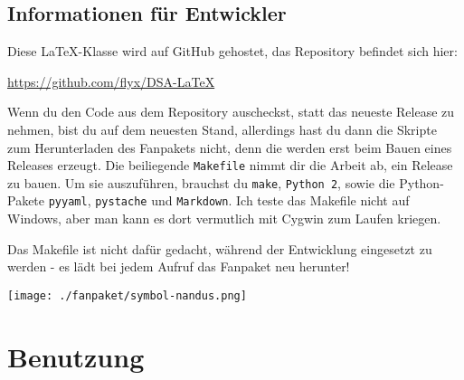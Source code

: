 \documentclass{dsa}
\begin{document}
  \begin{dsaBoxPortrait}
    \subsection*{\normalsize Informationen für Entwickler}
    
    Diese LaTeX-Klasse wird auf GitHub gehostet, das Repository befindet sich
    hier:
    
    \url{https://github.com/flyx/DSA-LaTeX}
    
    Wenn du den Code aus dem Repository aus\-checkst, statt das neueste
    Release zu nehmen, bist du auf dem neuesten Stand, allerdings hast du
    dann die Skripte zum Herunterladen des Fanpakets nicht, denn die werden
    erst beim Bauen eines Releases erzeugt. Die beiliegende \texttt{Makefile}
    nimmt dir die Arbeit ab, ein Release zu bauen. Um sie auszuführen, brauchst
    du \texttt{make}, \texttt{Python 2}, sowie die Python-Pakete
    \texttt{pyyaml}, \texttt{pystache} und \texttt{Markdown}. Ich teste das
    Makefile nicht auf Windows, aber man kann es dort vermutlich mit
    Cygwin zum Laufen kriegen. 
    
    Das Makefile ist nicht dafür gedacht, während der Entwicklung eingesetzt
    zu werden - es lädt bei jedem Aufruf das Fanpaket neu herunter!
    
  \end{dsaBoxPortrait}
  
  \begin{center}
    \texttt{[image: ./fanpaket/symbol-nandus.png]}
  \end{center}
  
  \onecolumn
  
  \section*{Benutzung}
  
\end{document}
